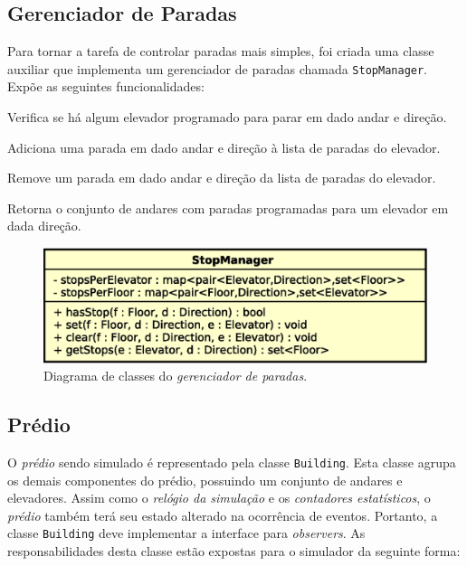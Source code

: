 \subsection{Gerenciador de Paradas}

  Para tornar a tarefa de controlar paradas mais simples, foi criada uma classe
  auxiliar que implementa um gerenciador de paradas chamada
  \texttt{StopManager}. Expõe as seguintes funcionalidades:

  \begin{description}[leftmargin=!,labelwidth=\widthof{\bfseries arrivalFloor}]
    \item[\texttt{hasStop}] Verifica se há algum elevador programado para parar em dado andar e direção.
    \item[\texttt{set}] Adiciona uma parada em dado andar e direção à lista de paradas do elevador.
    \item[\texttt{clear}] Remove um parada em dado andar e direção da lista de paradas do elevador.
    \item[\texttt{getStops}] Retorna o conjunto de andares com paradas programadas para um elevador em dada direção.
  \end{description}

  \begin{figure}[htb!]
    \centering
    \includegraphics[scale=0.6]{img/StopManager}
    \caption{Diagrama de classes do \textit{gerenciador de paradas}.}
  \label{fig:diagram:stopmanager}
  \end{figure}

\subsection{Prédio} \label{model:state:building}

O \textit{prédio} sendo simulado é representado pela classe \texttt{Building}.
Esta classe agrupa os demais componentes do prédio, possuindo um conjunto de
andares e elevadores. Assim como o \textit{relógio da simulação} e os
\textit{contadores estatísticos}, o \textit{prédio} também terá seu estado
alterado na ocorrência de eventos. Portanto, a classe \texttt{Building} deve
implementar a interface para \textit{observers}. As responsabilidades desta
classe estão expostas para o simulador da seguinte forma:

